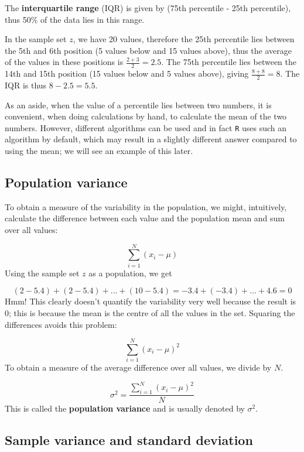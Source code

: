 \documentclass[
  oneside]{krantz}
\begin{document}
The \textbf{interquartile range} (IQR) is given by (75th percentile - 25th percentile), thus 50\% of the data lies in this range.

In the sample set \(z\), we have 20 values, therefore the 25th percentile lies between the 5th and 6th position (5 values below and 15 values above), thus the average of the values in these positions is \(\frac{2+3}2 = 2.5\). The 75th percentile lies between the 14th and 15th position (15 values below and 5 values above), giving \(\frac{8+8}2= 8\). The IQR is thus \(8 - 2.5 = 5.5\).

As an aside, when the value of a percentile lies between two numbers, it is convenient, when doing calculations by hand, to calculate the mean of the two numbers. However, different algorithms can be used and in fact \texttt{R} uses such an algorithm by default, which may result in a slightly different answer compared to using the mean; we will see an example of this later.

\hypertarget{population-variance}{%
\subsection{Population variance}\label{population-variance}}

To obtain a measure of the variability in the population, we might, intuitively, calculate the difference between each value and the population mean and sum over all values:

\[ \sum_{i=1}^{N} (x_i - \mu) \]
Using the sample set \(z\) as a population, we get

\[(2-5.4) + (2-5.4) + ... + (10-5.4) = -3.4 + (-3.4) + ...+ 4.6 = 0\]
Hmm! This clearly doesn't quantify the variability very well because the result is 0; this is because the mean is the centre of all the values in the set. Squaring the differences avoids this problem:

\[ \sum_{i=1}^{N} (x_i - \mu)^2 \]
To obtain a measure of the average difference over all values, we divide by \(N\).

\[\sigma^2 = \frac{\sum_{i=1}^N{(x_i - \mu)^2}}{N} \]
This is called the \textbf{population variance} and is usually denoted by \(\sigma^2\).

\hypertarget{sample-variance-and-standard-deviation}{%
\subsection{Sample variance and standard deviation}\label{sample-variance-and-standard-deviation}}
\end{document}
